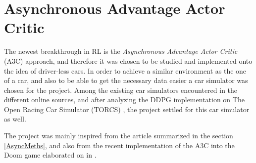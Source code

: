 \section{Asynchronous Advantage Actor Critic}
The newest breakthrough in RL is the \textit{Asynchronous Advantage Actor Critic} (A3C) approach, and therefore it was chosen to be studied and implemented onto the idea of driver-less cars. In order to achieve a similar environment as the one of a car, and also to be able to get the necessary data easier a car simulator was chosen for the project. Among the existing car simulators encountered in the different online sources, and after analyzing the DDPG implementation on The Open Racing Car Simulator (TORCS) \cite{DDPG_Torcs}, the project settled for this car simulator as well.

The project was mainly inspired from the article \cite{DBLP:journals/corr/MnihBMGLHSK16} summarized in the section \ref{AsyncMeths}, and also from the recent implementation of the A3C into the Doom game elaborated on in \cite{A3CDoom}.

